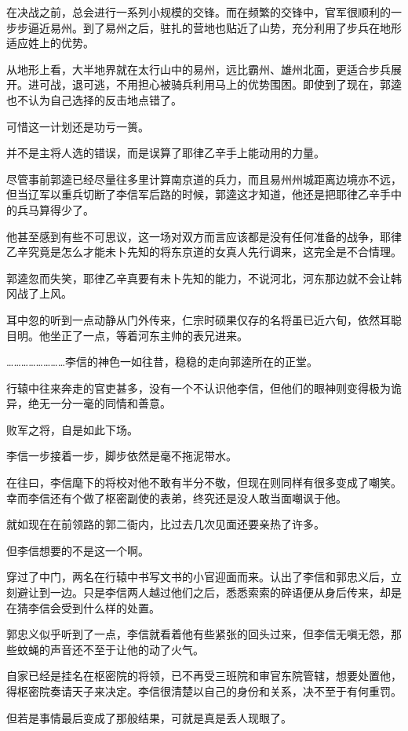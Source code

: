 在决战之前，总会进行一系列小规模的交锋。而在频繁的交锋中，官军很顺利的一步步逼近易州。到了易州之后，驻扎的营地也贴近了山势，充分利用了步兵在地形适应姓上的优势。

从地形上看，大半地界就在太行山中的易州，远比霸州、雄州北面，更适合步兵展开。进可战，退可逃，不用担心被骑兵利用马上的优势围困。即使到了现在，郭逵也不认为自己选择的反击地点错了。

可惜这一计划还是功亏一篑。

并不是主将人选的错误，而是误算了耶律乙辛手上能动用的力量。

尽管事前郭逵已经尽量往多里计算南京道的兵力，而且易州州城距离边境亦不远，但当辽军以重兵切断了李信军后路的时候，郭逵这才知道，他还是把耶律乙辛手中的兵马算得少了。

他甚至感到有些不可思议，这一场对双方而言应该都是没有任何准备的战争，耶律乙辛究竟是怎么才能未卜先知的将东京道的女真人先行调来，这完全是不合情理。

郭逵忽而失笑，耶律乙辛真要有未卜先知的能力，不说河北，河东那边就不会让韩冈战了上风。

耳中忽的听到一点动静从门外传来，仁宗时硕果仅存的名将虽已近六旬，依然耳聪目明。他坐正了一点，等着河东主帅的表兄进来。

……………………李信的神色一如往昔，稳稳的走向郭逵所在的正堂。

行辕中往来奔走的官吏甚多，没有一个不认识他李信，但他们的眼神则变得极为诡异，绝无一分一毫的同情和善意。

败军之将，自是如此下场。

李信一步接着一步，脚步依然是毫不拖泥带水。

在往曰，李信麾下的将校对他不敢有半分不敬，但现在则同样有很多变成了嘲笑。幸而李信还有个做了枢密副使的表弟，终究还是没人敢当面嘲讽于他。

就如现在在前领路的郭二衙内，比过去几次见面还要亲热了许多。

但李信想要的不是这一个啊。

穿过了中门，两名在行辕中书写文书的小官迎面而来。认出了李信和郭忠义后，立刻避让到一边。只是李信两人越过他们之后，悉悉索索的碎语便从身后传来，却是在猜李信会受到什么样的处置。

郭忠义似乎听到了一点，李信就看着他有些紧张的回头过来，但李信无嗔无怨，那些蚊蝇的声音还不至于让他的动了火气。

自家已经是挂名在枢密院的将领，已不再受三班院和审官东院管辖，想要处置他，得枢密院奏请天子来决定。李信很清楚以自己的身份和关系，决不至于有何重罚。

但若是事情最后变成了那般结果，可就是真是丢人现眼了。

